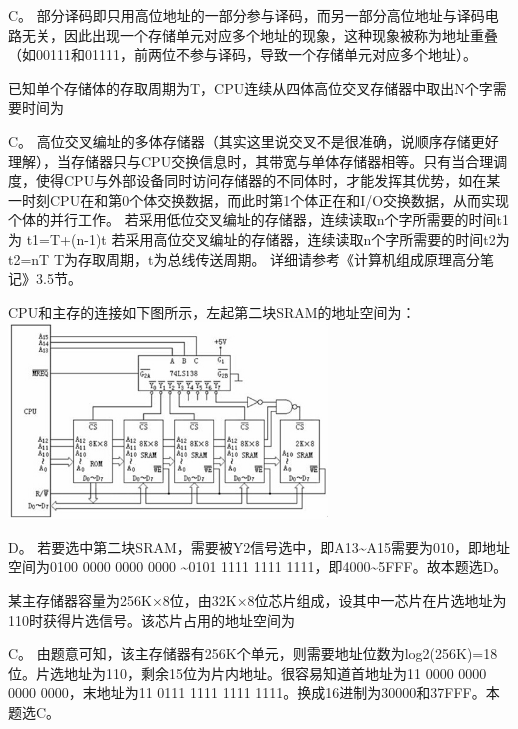\begin{solution}C。
部分译码即只用高位地址的一部分参与译码，而另一部分高位地址与译码电路无关，因此出现一个存储单元对应多个地址的现象，这种现象被称为地址重叠（如00111和01111，前两位不参与译码，导致一个存储单元对应多个地址）。
\end{solution}
\question 已知单个存储体的存取周期为T，CPU连续从四体高位交叉存储器中取出N个字需要时间为
\par{}
\begin{solution}C。
高位交叉编址的多体存储器（其实这里说交叉不是很准确，说顺序存储更好理解），当存储器只与CPU交换信息时，其带宽与单体存储器相等。只有当合理调度，使得CPU与外部设备同时访问存储器的不同体时，才能发挥其优势，如在某一时刻CPU在和第0个体交换数据，而此时第1个体正在和I/O交换数据，从而实现个体的并行工作。
若采用低位交叉编址的存储器，连续读取n个字所需要的时间t1为 t1=T+(n-1)t
若采用高位交叉编址的存储器，连续读取n个字所需要的时间t2为 t2=nT
T为存取周期，t为总线传送周期。
详细请参考《计算机组成原理高分笔记》3.5节。
\end{solution}
\question CPU和主存的连接如下图所示，左起第二块SRAM的地址空间为：
\includegraphics[width=3.33333in,height=2.05208in]{computerassets/abb8d51d2db36dda74a8b1a0ac81edd9.jpeg}
\par{}
\begin{solution}D。
若要选中第二块SRAM，需要被Y2信号选中，即A13\textasciitilde{}A15需要为010，即地址空间为0100
0000 0000 0000 \textasciitilde{}0101 1111 1111
1111，即4000\textasciitilde{}5FFF。故本题选D。
\end{solution}
\question 某主存储器容量为256K×8位，由32K×8位芯片组成，设其中一芯片在片选地址为110时获得片选信号。该芯片占用的地址空间为
\par{}
\begin{solution}C。
由题意可知，该主存储器有256K个单元，则需要地址位数为log2(256K)=18位。片选地址为110，剩余15位为片内地址。很容易知道首地址为11
0000 0000 0000 0000，末地址为11 0111 1111 1111
1111。换成16进制为30000和37FFF。本题选C。
\end{solution}

